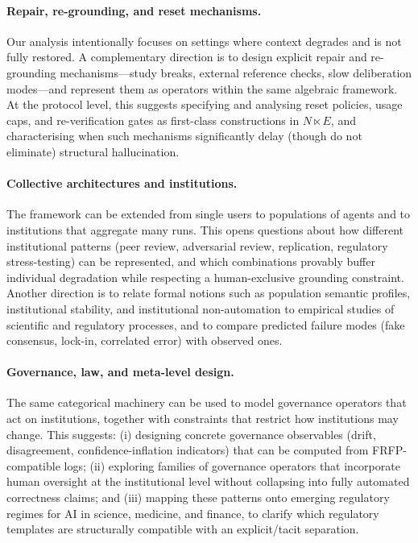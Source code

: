 \documentclass[11pt]{article}
\theoremstyle{definition}
\begin{document}
\paragraph{Repair, re-grounding, and reset mechanisms.}
Our analysis intentionally focuses on settings where context degrades and is not fully restored. A complementary direction is to design explicit repair and re-grounding mechanisms---study breaks, external reference checks, slow deliberation modes---and represent them as operators within the same algebraic framework. At the protocol level, this suggests specifying and analysing reset policies, usage caps, and re-verification gates as first-class constructions in \(N \ltimes E\), and characterising when such mechanisms significantly delay (though do not eliminate) structural hallucination.

\paragraph{Collective architectures and institutions.}
The framework can be extended from single users to populations of agents and to institutions that aggregate many runs. This opens questions about how different institutional patterns (peer review, adversarial review, replication, regulatory stress-testing) can be represented, and which combinations provably buffer individual degradation while respecting a human-exclusive grounding constraint. Another direction is to relate formal notions such as population semantic profiles, institutional stability, and institutional non-automation to empirical studies of scientific and regulatory processes, and to compare predicted failure modes (fake consensus, lock-in, correlated error) with observed ones.

\paragraph{Governance, law, and meta-level design.}
The same categorical machinery can be used to model governance operators that act on institutions, together with constraints that restrict how institutions may change. This suggests: (i) designing concrete governance observables (drift, disagreement, confidence-inflation indicators) that can be computed from FRFP-compatible logs; (ii) exploring families of governance operators that incorporate human oversight at the institutional level without collapsing into fully automated correctness claims; and (iii) mapping these patterns onto emerging regulatory regimes for AI in science, medicine, and finance, to clarify which regulatory templates are structurally compatible with an explicit/tacit separation.
\end{document}
